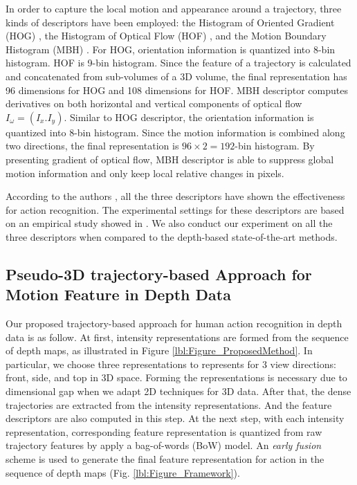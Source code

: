 \documentclass[review]{elsarticle}
\begin{document}
In order to capture the local motion and appearance around a trajectory, three kinds of descriptors have been employed: the Histogram of Oriented Gradient (HOG) \cite{dalal2005histograms}, the Histogram of Optical Flow (HOF) \cite{laptev2008learning}, and the Motion Boundary Histogram (MBH) \cite{dalal2006human}. For HOG, orientation information is quantized into 8-bin histogram. HOF is 9-bin histogram. Since the feature of a trajectory is calculated and concatenated from sub-volumes of a 3D volume, the final representation has 96 dimensions for HOG and 108 dimensions for HOF. MBH descriptor computes derivatives on both horizontal and vertical components of optical flow $I_\omega = (I_x. I_y)$. Similar to HOG descriptor, the orientation information is quantized into 8-bin histogram. Since the motion information is combined along two directions, the final representation is $96 \times 2 = 192$-bin histogram. By presenting gradient of optical flow, MBH descriptor is able to suppress global motion information and only keep local relative changes in pixels.

According to the authors \cite{laptev2008learning, wang2011densetraj, wang2009evaluation, liu2009recognizing}, all the three descriptors have shown the effectiveness for action recognition. The experimental settings for these descriptors are based on an empirical study showed in \cite{wang2011densetraj}. We also conduct our experiment on all the three descriptors when compared to the depth-based state-of-the-art methods.

\subsection{Pseudo-3D trajectory-based Approach for Motion Feature in Depth Data}

Our proposed trajectory-based approach for human action recognition in depth data is as follow. At first, intensity representations are formed from the sequence of depth maps, as illustrated in Figure \ref{lbl:Figure_ProposedMethod}. In particular, we choose three representations to represents for 3 view directions: front, side, and top in 3D space. Forming the representations is necessary due to dimensional gap when we adapt 2D techniques for 3D data. After that, the dense trajectories are extracted from the intensity representations. And the feature descriptors are also computed in this step. At the next step, with each intensity representation, corresponding feature representation is quantized from raw trajectory features by apply a bag-of-words (BoW) model. An \textit{early fusion} scheme is used to generate the final feature representation for action in the sequence of depth maps (Fig. \ref{lbl:Figure_Framework}).
\end{document}
